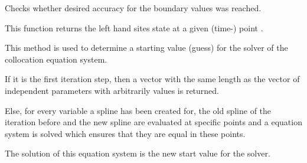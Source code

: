 \documentclass[letterpaper,10pt,english]{sphinxmanual}
\begin{document}
\begin{fulllineitems}
\begin{fulllineitems}
\end{fulllineitems}


\begin{fulllineitems}
\label{pytrajectory:pytrajectory.trajectory.Trajectory.checkAccuracy}
Checks whether desired accuracy for the boundary values was reached.

\end{fulllineitems}


\begin{fulllineitems}
\label{pytrajectory:pytrajectory.trajectory.Trajectory.clear}
\end{fulllineitems}


\begin{fulllineitems}
\label{pytrajectory:pytrajectory.trajectory.Trajectory.dx}
This function returns the left hand sites state at a given (time-) point .

\end{fulllineitems}


\begin{fulllineitems}
\label{pytrajectory:pytrajectory.trajectory.Trajectory.getGuess}
This method is used to determine a starting value (guess) for the
solver of the collocation equation system.

If it is the first iteration step, then a vector with the same length as the vector of
independent parameters with arbitrarily values is returned.

Else, for every variable a spline has been created for, the old spline of the iteration
before and the new spline are evaluated at specific points and a equation system
is solved which ensures that they are equal in these points.

The solution of this equation system is the new start value for the solver.

\end{fulllineitems}


\end{fulllineitems}
\end{document}
